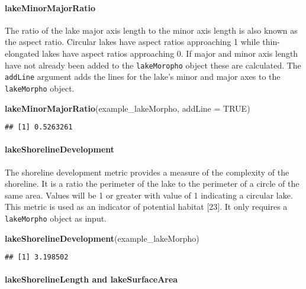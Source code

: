 \documentclass[11pt,]{article}
\newenvironment{Shaded}{\begin{snugshade}}{\end{snugshade}}
\newcommand{\KeywordTok}[1]{\textcolor[rgb]{0.13,0.29,0.53}{\textbf{{#1}}}}
\newcommand{\DataTypeTok}[1]{\textcolor[rgb]{0.13,0.29,0.53}{{#1}}}
\newcommand{\OtherTok}[1]{\textcolor[rgb]{0.56,0.35,0.01}{{#1}}}
\newcommand{\NormalTok}[1]{{#1}}
\begin{document}
\paragraph{lakeMinorMajorRatio}\label{lakeminormajorratio}

The ratio of the lake major axis length to the minor axis length is also
known as the aspect ratio. Circular lakes have aspect ratios approaching
1 while thin-elongated lakes have aspect ratios approaching 0. If major
and minor axis length have not already been added to the
\texttt{lakeMoropho} object these are calculated. The \texttt{addLine}
argument adds the lines for the lake's minor and major axes to the
\texttt{lakeMorpho} object.

\begin{Shaded}
\begin{Highlighting}[]
\KeywordTok{lakeMinorMajorRatio}\NormalTok{(example_lakeMorpho, }\DataTypeTok{addLine =} \OtherTok{TRUE}\NormalTok{)}
\end{Highlighting}
\end{Shaded}

\begin{verbatim}
## [1] 0.5263261
\end{verbatim}

\paragraph{lakeShorelineDevelopment}\label{lakeshorelinedevelopment}

The shoreline development metric provides a measure of the complexity of
the shoreline. It is a ratio the perimeter of the lake to the perimeter
of a circle of the same area. Values will be 1 or greater with value of
1 indicating a circular lake. This metric is used as an indicator of
potential habitat {[}23{]}. It only requires a \texttt{lakeMorpho}
object as input.

\begin{Shaded}
\begin{Highlighting}[]
\KeywordTok{lakeShorelineDevelopment}\NormalTok{(example_lakeMorpho)}
\end{Highlighting}
\end{Shaded}

\begin{verbatim}
## [1] 3.198502
\end{verbatim}

\paragraph{lakeShorelineLength and
lakeSurfaceArea}\label{lakeshorelinelength-and-lakesurfacearea}
\end{document}
